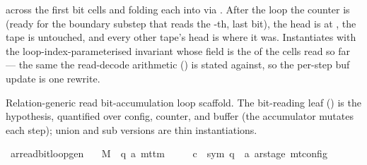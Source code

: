 \begin{isabellebody}
\begin{isamarkuptext}
   across the first  bit cells and folding each
  into  via .  After the loop the counter
  is  (ready for the boundary substep that reads the
  -th, last bit), the head is at , the
  tape is untouched, and every other tape's head is where it was.
  Instantiates 
  with the loop-index-parameterised invariant whose 
  field is the  of the cells read so
  far — the same  the read-decode arithmetic
  () is stated against, so the
  per-step buf update is one  rewrite.%
\end{isamarkuptext}\isamarkuptrue%
%
\begin{isamarkuptext}%
Relation-generic read bit-accumulation loop scaffold.  The
  bit-reading leaf () is the 
  hypothesis, quantified over config, counter, and buffer (the
  accumulator mutates each step); union and sub versions are thin
  instantiations.%
\end{isamarkuptext}\isamarkuptrue%
\isamarkupfalse%
\ ar{\isacharunderscore}{\kern0pt}read{\isacharunderscore}{\kern0pt}bit{\isacharunderscore}{\kern0pt}loop{\isacharunderscore}{\kern0pt}gen{\isacharcolon}{\kern0pt}\isanewline
\ \ \ M\ {\isacharcolon}{\kern0pt}{\isacharcolon}{\kern0pt}\ {\isachardoublequoteopen}{\isacharparenleft}{\kern0pt}{\isacharprime}{\kern0pt}q{\isacharcomma}{\kern0pt}\ {\isacharprime}{\kern0pt}a{\isacharparenright}{\kern0pt}\ mttm{\isachardoublequoteclose}\isanewline
\ \ \ \ \ c{\isacharprime}{\kern0pt}\ {\isacharcolon}{\kern0pt}{\isacharcolon}{\kern0pt}\ {\isachardoublequoteopen}{\isacharparenleft}{\kern0pt}sym{}{\isacharcomma}{\kern0pt}\ {\isacharprime}{\kern0pt}q\ {\isasymtimes}\ {\isacharprime}{\kern0pt}a\ ar{\isacharunderscore}{\kern0pt}stage{\isacharparenright}{\kern0pt}\ mt{\isacharunderscore}{\kern0pt}config{\isachardoublequoteclose}\isanewline

\end{isabellebody}
